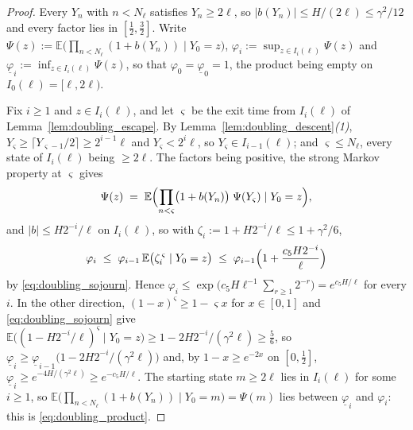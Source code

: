 \begin{proof}
Every $Y_n$ with $n<N_\ell$ satisfies $Y_n\geq2\ell$, so $|b(Y_n)|\leq H/(2\ell)\leq\gamma^2/12$
and every factor lies in $[\tfrac12,\tfrac32]$. Write
$\Psi(z):=\mathbb E\bigl(\prod_{n<N_\ell}(1+b(Y_n))\mid Y_0=z\bigr)$, $\varphi_i:=\sup_{z\in I_i(\ell)}\Psi(z)$
and $\underline\varphi_i:=\inf_{z\in I_i(\ell)}\Psi(z)$, so that
$\varphi_0=\underline\varphi_0=1$, the product being empty on $I_0(\ell)=[\ell,2\ell)$.

Fix $i\geq1$ and $z\in I_i(\ell)$, and let $\varsigma$ be the exit time from $I_i(\ell)$ of
Lemma~\ref{lem:doubling_escape}. By Lemma~\ref{lem:doubling_descent}\emph{(1)},
$Y_\varsigma\geq\lceil Y_{\varsigma-1}/2\rceil\geq2^{i-1}\ell$ and $Y_\varsigma<2^{i}\ell$, so
$Y_\varsigma\in I_{i-1}(\ell)$; and $\varsigma\leq N_\ell$, every state of $I_i(\ell)$ being $\geq2\ell$. The
factors being positive, the strong Markov property at $\varsigma$ gives
\begin{equation}
    \Psi(z)\;=\;\mathbb E\Bigl(\prod_{n<\varsigma}\bigl(1+b(Y_n)\bigr)\;\Psi(Y_\varsigma)\mid Y_0=z\Bigr),
\end{equation}
and $|b|\leq H2^{-i}/\ell$ on $I_i(\ell)$, so with $\zeta_i:=1+H2^{-i}/\ell\leq1+\gamma^2/6$,
\begin{equation}
    \varphi_i\;\leq\;\varphi_{i-1}\,\mathbb E\bigl(\zeta_i^{\,\varsigma}\mid Y_0=z\bigr)
    \;\leq\;\varphi_{i-1}\Bigl(1+\frac{c_5H2^{-i}}{\ell}\Bigr)
\end{equation}
by \eqref{eq:doubling_sojourn}. Hence $\varphi_i\leq\exp\bigl(c_5H\ell^{-1}\sum_{r\geq1}2^{-r}\bigr)
=e^{c_5H/\ell}$ for every $i$. In the other direction, $(1-x)^{\varsigma}\geq1-\varsigma x$
for $x\in[0,1]$ and \eqref{eq:doubling_sojourn} give
$\mathbb E\bigl((1-H2^{-i}/\ell)^{\varsigma}\mid Y_0=z\bigr)\geq1-2H2^{-i}/(\gamma^2\ell)\geq\tfrac56$,
so $\underline\varphi_i\geq\underline\varphi_{i-1}\bigl(1-2H2^{-i}/(\gamma^2\ell)\bigr)$ and,
by $1-x\geq e^{-2x}$ on $[0,\tfrac12]$, $\underline\varphi_i\geq e^{-4H/(\gamma^2\ell)}\geq
e^{-c_5H/\ell}$. The starting state $m\geq2\ell$ lies in $I_i(\ell)$ for some $i\geq1$, so
$\mathbb E\bigl(\prod_{n<N_\ell}(1+b(Y_n))\mid Y_0=m\bigr)=\Psi(m)$ lies between $\underline\varphi_i$
and $\varphi_i$: this is \eqref{eq:doubling_product}.
\end{proof}

